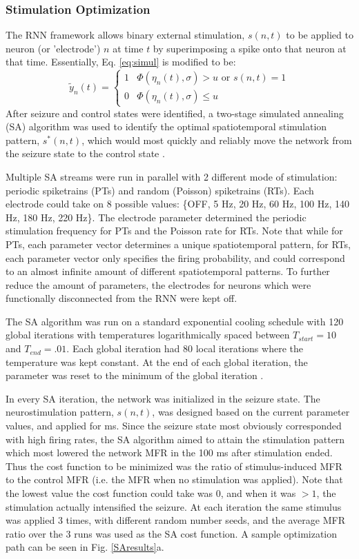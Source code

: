 \documentclass[11pt,a4paper,final]{article}
\begin{document}
	\subsubsection{Stimulation Optimization}
The RNN framework allows binary external stimulation, $s(n,t)$ to be applied to neuron (or 'electrode') $n$ at time $t$ by superimposing a spike onto that neuron at that time.
Essentially, Eq. \ref{eq:simul} is modified to be:
\begin{equation}
\tilde{y}_n(t) =
\begin{cases}
1   & \Phi(\eta_n(t),\sigma) > u \text{ or } s(n,t)=1 \\
0   & \Phi(\eta_n(t),\sigma) \leq u
\end{cases}
\label{eq:stim}
\end{equation}
After seizure and control states were identified, a two-stage simulated annealing (SA) algorithm was used to identify the optimal spatiotemporal stimulation pattern, $s^*(n,t)$, which would most quickly and reliably move the network from the seizure state to the control state \citep{kirkpatrick83}.

Multiple SA streams were run in parallel with 2 different mode of stimulation: periodic spiketrains (PTs) and random (Poisson) spiketrains (RTs).
Each electrode could take on 8 possible values: \{OFF, 5 Hz, 20 Hz, 60 Hz, 100 Hz, 140 Hz, 180 Hz, 220 Hz\}.
The electrode parameter determined the periodic stimulation frequency for PTs and the Poisson rate for RTs.
Note that while for PTs, each parameter vector determines a unique spatiotemporal pattern, for RTs, each parameter vector only specifies the firing probability, and could correspond to an almost infinite amount of different spatiotemporal patterns.
To further reduce the amount of parameters, the electrodes for neurons which were functionally disconnected from the RNN were kept off.

The SA algorithm was run on a standard exponential cooling schedule with 120 global iterations with temperatures logarithmically spaced between $T_{start}=10$ and $T_{end}=.01$.
Each global iteration had 80 local iterations where the temperature was kept constant.
At the end of each global iteration, the parameter was reset to the minimum of the global iteration \citep{henderson03}.

In every SA iteration, the network was initialized in the seizure state.
The neurostimulation pattern, $s(n,t)$, was designed based on the current parameter values, and applied for \len ms.
Since the seizure state most obviously corresponded with high firing rates, the SA algorithm aimed to attain the stimulation pattern which most lowered the network MFR in the 100 ms after stimulation ended.
Thus the cost function to be minimized was the ratio of stimulus-induced MFR to the control MFR (i.e. the MFR when no stimulation was applied).
Note that the lowest value the cost function could take was 0, and when it was $>1$, the stimulation actually intensified the seizure.
At each iteration the same stimulus was applied 3 times, with different random number seeds, and the average MFR ratio over the 3 runs was used as the SA cost function.
A sample optimization path can be seen in Fig. \ref{SAresults}a.
\end{document}
